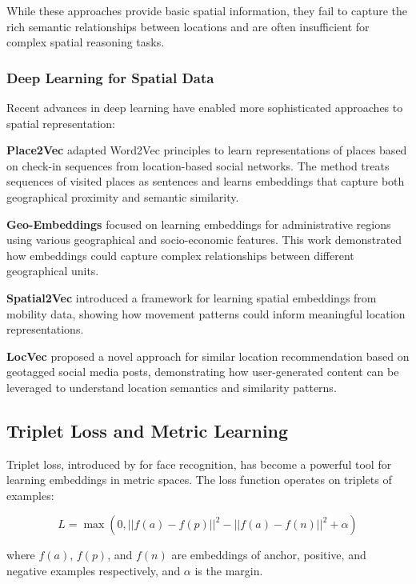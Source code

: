 While these approaches provide basic spatial information, they fail to capture the rich semantic relationships between locations and are often insufficient for complex spatial reasoning tasks.

\subsubsection{Deep Learning for Spatial Data}

Recent advances in deep learning have enabled more sophisticated approaches to spatial representation:

\textbf{Place2Vec} \cite{place2vec} adapted Word2Vec principles to learn representations of places based on check-in sequences from location-based social networks. The method treats sequences of visited places as sentences and learns embeddings that capture both geographical proximity and semantic similarity.

\textbf{Geo-Embeddings} \cite{geo2vec} focused on learning embeddings for administrative regions using various geographical and socio-economic features. This work demonstrated how embeddings could capture complex relationships between different geographical units.

\textbf{Spatial2Vec} \cite{spatial2vec} introduced a framework for learning spatial embeddings from mobility data, showing how movement patterns could inform meaningful location representations.

\textbf{LocVec} \cite{hal2019locvec} proposed a novel approach for similar location recommendation based on geotagged social media posts, demonstrating how user-generated content can be leveraged to understand location semantics and similarity patterns.

\subsection{Triplet Loss and Metric Learning}

Triplet loss, introduced by \cite{schroff2015facenet} for face recognition, has become a powerful tool for learning embeddings in metric spaces. The loss function operates on triplets of examples:

\begin{equation}
L = \max(0, ||f(a) - f(p)||^2 - ||f(a) - f(n)||^2 + \alpha)
\end{equation}

where $f(a)$, $f(p)$, and $f(n)$ are embeddings of anchor, positive, and negative examples respectively, and $\alpha$ is the margin.

